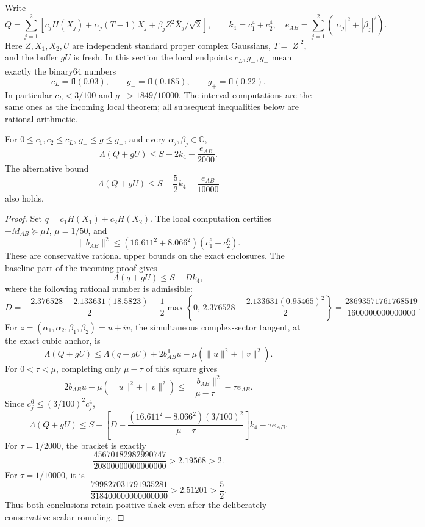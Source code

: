 Write
\[
 Q=\sum_{j=1}^2\left[c_jH(X_j)+\alpha_j(T-1)X_j+
                  \beta_jZ^2\bar X_j/\sqrt2\right],\qquad
 k_4=c_1^4+c_2^4,\quad
 e_{AB}=\sum_{j=1}^2(|\alpha_j|^2+|\beta_j|^2).
\]
Here \(Z,X_1,X_2,U\) are independent standard proper complex
Gaussians, \(T=|Z|^2\), and the buffer \(gU\) is fresh.
In this section the local endpoints \(c_L,g_-,g_+\) mean exactly
the binary64 numbers
\[
 c_L=\mathrm{fl}(0.03),\qquad
 g_-=\mathrm{fl}(0.185),\qquad
 g_+=\mathrm{fl}(0.22).
\]
In particular \(c_L<3/100\) and \(g_->1849/10000\).
The interval computations are the same ones as the incoming local
theorem; all subsequent inequalities below are rational arithmetic.

\begin{theorem}
\label{thm:buffered-two-driver-retained}
For \(0\le c_1,c_2\le c_L\), \(g_-\le g\le g_+\), and every
\(\alpha_j,\beta_j\in\mathbb C\),
\[
 \boxed{\Lambda(Q+gU)\le S-2k_4-\frac{e_{AB}}{2000}.}
\]
The alternative bound
\[
 \Lambda(Q+gU)\le S-\frac52k_4-\frac{e_{AB}}{10000}
\]
also holds.
\end{theorem}
\begin{proof}
Set \(q=c_1H(X_1)+c_2H(X_2)\).
The local computation certifies \(-M_{AB}\succeq\mu I\),
\(\mu=1/50\), and
\[
 \|b_{AB}\|^2\le
 (16.611^2+8.066^2)(c_1^6+c_2^6).
\]
These are conservative rational upper bounds on the exact enclosures.
The baseline part of the incoming proof gives
\[
 \Lambda(q+gU)\le S-Dk_4,
\]
where the following rational number is admissible:
\[
 D=-\frac{2.376528-2.133631(18.5823)}2
   -\frac12\max\left\{0,\,
        2.376528-\frac{2.133631(0.95465)^2}{2}\right\}
  =\frac{28693571761768519}{1600000000000000}.
\]
For \(z=(\alpha_1,\alpha_2,\beta_1,\beta_2)=u+iv\), the simultaneous
complex-sector tangent, at the exact cubic anchor, is
\[
 \Lambda(Q+gU)
 \le\Lambda(q+gU)+2b_{AB}^{\mathsf T}u
                   -\mu(\|u\|^2+\|v\|^2).
\]
For \(0<\tau<\mu\), completing only \(\mu-\tau\) of this square gives
\[
 2b_{AB}^{\mathsf T}u-\mu(\|u\|^2+\|v\|^2)
 \le\frac{\|b_{AB}\|^2}{\mu-\tau}-\tau e_{AB}.
\]
Since \(c_j^6\le(3/100)^2c_j^4\),
\[
 \Lambda(Q+gU)\le
 S-\left[D-
 \frac{(16.611^2+8.066^2)(3/100)^2}{\mu-\tau}\right]k_4-\tau e_{AB}.
\]
For \(\tau=1/2000\), the bracket is exactly
\[
 \frac{45670182982990747}{20800000000000000}>2.19568>2.
\]
For \(\tau=1/10000\), it is
\[
 \frac{799827031791935281}{318400000000000000}>2.51201>\frac52.
\]
Thus both conclusions retain positive slack even after the
deliberately conservative scalar rounding.
\end{proof}

